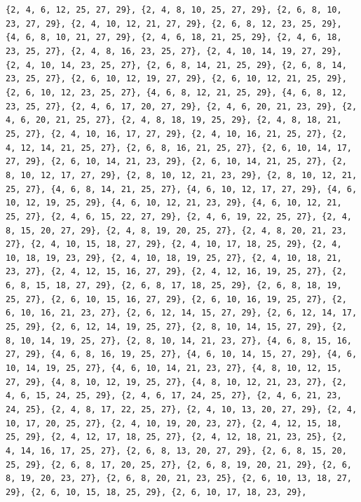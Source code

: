 \documentclass[11pt,a4paper]{article}
\begin{document}
\texttt{\{2, 4, 6, 12, 25, 27, 29\}, \{2, 4, 8, 10, 25, 27, 29\}, \{2, 6, 8, 10, 23, 27, 29\}, \{2, 4, 10, 12, 21, 27, 29\}, \{2, 6, 8, 12, 23, 25, 29\},
\{4, 6, 8, 10, 21, 27, 29\}, \{2, 4, 6, 18, 21, 25, 29\}, \{2, 4, 6, 18, 23, 25, 27\}, \{2, 4, 8, 16, 23, 25, 27\}, \{2, 4, 10, 14, 19, 27, 29\},
\{2, 4, 10, 14, 23, 25, 27\}, \{2, 6, 8, 14, 21, 25, 29\}, \{2, 6, 8, 14, 23, 25, 27\}, \{2, 6, 10, 12, 19, 27, 29\}, \{2, 6, 10, 12, 21, 25, 29\},
\{2, 6, 10, 12, 23, 25, 27\}, \{4, 6, 8, 12, 21, 25, 29\}, \{4, 6, 8, 12, 23, 25, 27\}, \{2, 4, 6, 17, 20, 27, 29\}, \{2, 4, 6, 20, 21, 23, 29\},
\{2, 4, 6, 20, 21, 25, 27\}, \{2, 4, 8, 18, 19, 25, 29\}, \{2, 4, 8, 18, 21, 25, 27\}, \{2, 4, 10, 16, 17, 27, 29\}, \{2, 4, 10, 16, 21, 25, 27\},
\{2, 4, 12, 14, 21, 25, 27\}, \{2, 6, 8, 16, 21, 25, 27\}, \{2, 6, 10, 14, 17, 27, 29\}, \{2, 6, 10, 14, 21, 23, 29\}, \{2, 6, 10, 14, 21, 25, 27\},
\{2, 8, 10, 12, 17, 27, 29\}, \{2, 8, 10, 12, 21, 23, 29\}, \{2, 8, 10, 12, 21, 25, 27\}, \{4, 6, 8, 14, 21, 25, 27\}, \{4, 6, 10, 12, 17, 27, 29\},
\{4, 6, 10, 12, 19, 25, 29\}, \{4, 6, 10, 12, 21, 23, 29\}, \{4, 6, 10, 12, 21, 25, 27\}, \{2, 4, 6, 15, 22, 27, 29\}, \{2, 4, 6, 19, 22, 25, 27\},
\{2, 4, 8, 15, 20, 27, 29\}, \{2, 4, 8, 19, 20, 25, 27\}, \{2, 4, 8, 20, 21, 23, 27\}, \{2, 4, 10, 15, 18, 27, 29\}, \{2, 4, 10, 17, 18, 25, 29\},
\{2, 4, 10, 18, 19, 23, 29\}, \{2, 4, 10, 18, 19, 25, 27\}, \{2, 4, 10, 18, 21, 23, 27\}, \{2, 4, 12, 15, 16, 27, 29\}, \{2, 4, 12, 16, 19, 25, 27\},
\{2, 6, 8, 15, 18, 27, 29\}, \{2, 6, 8, 17, 18, 25, 29\}, \{2, 6, 8, 18, 19, 25, 27\}, \{2, 6, 10, 15, 16, 27, 29\}, \{2, 6, 10, 16, 19, 25, 27\},
\{2, 6, 10, 16, 21, 23, 27\}, \{2, 6, 12, 14, 15, 27, 29\}, \{2, 6, 12, 14, 17, 25, 29\}, \{2, 6, 12, 14, 19, 25, 27\}, \{2, 8, 10, 14, 15, 27, 29\},
\{2, 8, 10, 14, 19, 25, 27\}, \{2, 8, 10, 14, 21, 23, 27\}, \{4, 6, 8, 15, 16, 27, 29\}, \{4, 6, 8, 16, 19, 25, 27\}, \{4, 6, 10, 14, 15, 27, 29\},
\{4, 6, 10, 14, 19, 25, 27\}, \{4, 6, 10, 14, 21, 23, 27\}, \{4, 8, 10, 12, 15, 27, 29\}, \{4, 8, 10, 12, 19, 25, 27\}, \{4, 8, 10, 12, 21, 23, 27\},
\{2, 4, 6, 15, 24, 25, 29\}, \{2, 4, 6, 17, 24, 25, 27\}, \{2, 4, 6, 21, 23, 24, 25\}, \{2, 4, 8, 17, 22, 25, 27\}, \{2, 4, 10, 13, 20, 27, 29\},
\{2, 4, 10, 17, 20, 25, 27\}, \{2, 4, 10, 19, 20, 23, 27\}, \{2, 4, 12, 15, 18, 25, 29\}, \{2, 4, 12, 17, 18, 25, 27\}, \{2, 4, 12, 18, 21, 23, 25\},
\{2, 4, 14, 16, 17, 25, 27\}, \{2, 6, 8, 13, 20, 27, 29\}, \{2, 6, 8, 15, 20, 25, 29\}, \{2, 6, 8, 17, 20, 25, 27\}, \{2, 6, 8, 19, 20, 21, 29\},
\{2, 6, 8, 19, 20, 23, 27\}, \{2, 6, 8, 20, 21, 23, 25\}, \{2, 6, 10, 13, 18, 27, 29\}, \{2, 6, 10, 15, 18, 25, 29\}, \{2, 6, 10, 17, 18, 23, 29\},
}
\end{document}
